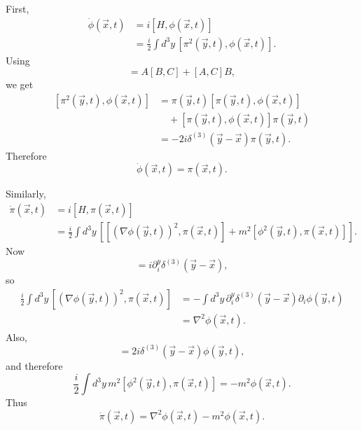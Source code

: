 \documentclass{article}
\begin{document}
First,
\begin{equation}
\begin{split}
    \dot\phi(\vec x,t)
    &=
    i[H,\phi(\vec x,t)]
    \\
    &=
    \frac{i}{2}
    \int d^3y\,
    [\pi^2(\vec y,t),\phi(\vec x,t)].
\end{split}
\end{equation}
Using
\begin{equation}
    [AB,C]=A[B,C]+[A,C]B,
\end{equation}
we get
\begin{equation}
\begin{split}
    [\pi^2(\vec y,t),\phi(\vec x,t)]
    &=
    \pi(\vec y,t)[\pi(\vec y,t),\phi(\vec x,t)]
    \\
    &\quad+
    [\pi(\vec y,t),\phi(\vec x,t)]\pi(\vec y,t)
    \\
    &=
    -2i\delta^{(3)}(\vec y-\vec x)\pi(\vec y,t).
\end{split}
\end{equation}
Therefore
\begin{equation}
    \boxed{
    \dot\phi(\vec x,t)=\pi(\vec x,t)
    }.
\end{equation}

Similarly,
\begin{equation}
\begin{split}
    \dot\pi(\vec x,t)
    &=
    i[H,\pi(\vec x,t)]
    \\
    &=
    \frac{i}{2}
    \int d^3y\,
    \left[
        [(\nabla\phi(\vec y,t))^2,\pi(\vec x,t)]
        +
        m^2[\phi^2(\vec y,t),\pi(\vec x,t)]
    \right].
\end{split}
\end{equation}
Now
\begin{equation}
    [\partial_i\phi(\vec y,t),\pi(\vec x,t)]
    =
    i\partial_i^y\delta^{(3)}(\vec y-\vec x),
\end{equation}
so
\begin{equation}
\begin{split}
    \frac{i}{2}
    \int d^3y\,
    [(\nabla\phi(\vec y,t))^2,\pi(\vec x,t)]
    &=
    -\int d^3y\,
    \partial_i^y\delta^{(3)}(\vec y-\vec x)
    \partial_i\phi(\vec y,t)
    \\
    &=
    \nabla^2\phi(\vec x,t).
\end{split}
\end{equation}
Also,
\begin{equation}
    [\phi^2(\vec y,t),\pi(\vec x,t)]
    =
    2i\delta^{(3)}(\vec y-\vec x)\phi(\vec y,t),
\end{equation}
and therefore
\begin{equation}
    \frac{i}{2}
    \int d^3y\,
    m^2[\phi^2(\vec y,t),\pi(\vec x,t)]
    =
    -m^2\phi(\vec x,t).
\end{equation}
Thus
\begin{equation}
    \boxed{
    \dot\pi(\vec x,t)
    =
    \nabla^2\phi(\vec x,t)-m^2\phi(\vec x,t)
    }.
\end{equation}
\end{document}
